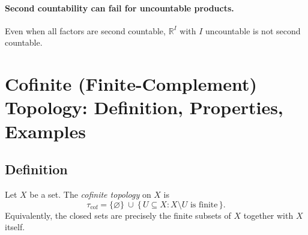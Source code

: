 \documentclass[12pt,a4paper]{article}
\theoremstyle{plain}
\theoremstyle{definition}
\theoremstyle{remark}
\theoremstyle{remark}
\begin{document}
\paragraph{Second countability can fail for uncountable products.}
Even when all factors are second countable, $\mathbb{R}^I$ with $I$ uncountable is not second countable.
	
	
	\section*{Cofinite (Finite-Complement) Topology: Definition, Properties, Examples}
	
	\subsection*{Definition}
	Let $X$ be a set. The \emph{cofinite topology} on $X$ is
	\[
	\tau_{\mathrm{cof}}=\{\varnothing\}\ \cup\ \{\,U\subseteq X : X\setminus U \text{ is finite}\,\}.
	\]
	Equivalently, the closed sets are precisely the finite subsets of $X$ together with $X$ itself.
	
\end{document}
